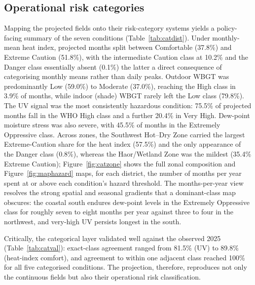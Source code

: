 \documentclass[pdflatex,sn-basic,lineno]{sn-jnl}
\begin{document}
\subsection{Operational risk categories}\label{sec:res-categories}
Mapping the projected fields onto their risk-category systems yields a
policy-facing summary of the seven conditions (Table~\ref{tab:catdist}). Under
monthly-mean heat index, projected months split between Comfortable (37.8\%) and
Extreme Caution (51.8\%), with the intermediate Caution class at 10.2\% and the
Danger class essentially absent (0.1\%) the latter a direct consequence of
categorising monthly means rather than daily peaks. Outdoor WBGT was
predominantly Low (59.0\%) to Moderate (37.0\%), reaching the High class in
3.9\% of months, while indoor (shade) WBGT rarely left the Low class (79.8\%).
The UV signal was the most consistently hazardous condition: 75.5\% of projected
months fall in the WHO High class and a further 20.4\% in Very High. Dew-point
moisture stress was also severe, with 45.5\% of months in the Extremely
Oppressive class. Across zones, the Southwest Hot--Dry Zone carried the largest
Extreme-Caution share for the heat index (57.5\%) and the only appearance of the
Danger class (0.8\%), whereas the Haor/Wetland Zone was the mildest (35.4\%
Extreme Caution); Figure~\ref{fig:catzone} shows the full zonal composition and
Figure~\ref{fig:maphazard} maps, for each district, the number of months per year
spent at or above each condition's hazard threshold. The months-per-year view
resolves the strong spatial and seasonal gradients that a dominant-class map
obscures: the coastal south endures dew-point levels in the Extremely Oppressive
class for roughly seven to eight months per year against three to four in the
northwest, and very-high UV persists longest in the south.

Critically, the categorical layer validated well against the observed 2025
(Table~\ref{tab:catval}): exact-class agreement ranged from 81.5\% (UV) to
89.8\% (heat-index comfort), and agreement to within one adjacent class reached
100\% for all five categorised conditions. The projection, therefore, reproduces
not only the continuous fields but also their operational risk classification.

\begin{table}[htbp]
\centering
\caption{Projected risk-category distribution (share of projected
district-months, 2025--2026, 64 districts). Only populated categories are shown.}
\label{tab:catdist}

\end{table}
\end{document}
